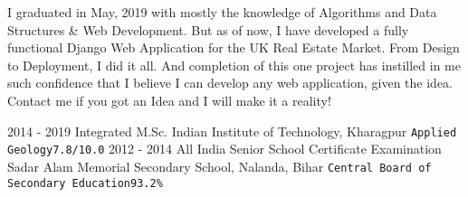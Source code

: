 \documentclass[8pt]{developercv} %
\begin{document}
\vspace{0.1cm}



\begin{minipage}[t]{1\textwidth} %
	\vspace{-\baselineskip} %
I graduated in May, 2019 with mostly the knowledge of Algorithms and Data Structures \& Web Development. But as of now, I have developed a fully functional Django Web Application for the UK Real Estate Market. From Design to Deployment, I did it all. And completion of this one project has instilled in me such confidence that I believe I can develop any web application, given the idea. Contact me if you got an Idea and I will make it a reality! \\ %
\end{minipage}
\begin{entrylist}
	\entry
		{2014 - 2019}
		{Integrated M.Sc.}
		{Indian Institute of Technology, Kharagpur}
		{\texttt{Applied Geology}\hfill\texttt{7.8/10.0}}
	\entry
		{2012 - 2014}
		{All India Senior School Certificate Examination}
		{Sadar Alam Memorial Secondary School, Nalanda, Bihar}
		{\texttt{Central Board of Secondary Education}\hfill\texttt{93.2\%}}
\end{entrylist}
\end{document}
